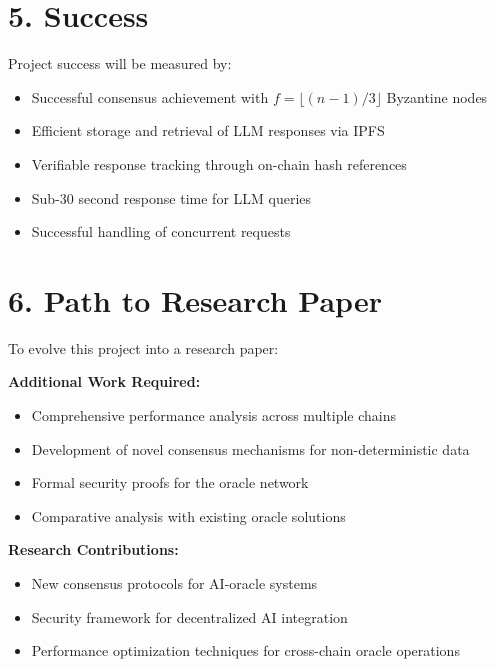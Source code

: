 \documentclass[12pt]{article}
\begin{document}
\section*{5. Success}
Project success will be measured by:
\begin{itemize}
    \item Successful consensus achievement with $f=\lfloor(n-1)/3\rfloor$ Byzantine nodes
    \item Efficient storage and retrieval of LLM responses via IPFS
    \item Verifiable response tracking through on-chain hash references
    \item Sub-30 second response time for LLM queries
    \item Successful handling of concurrent requests
\end{itemize}

\section*{6. Path to Research Paper}
To evolve this project into a research paper:

\textbf{Additional Work Required:}
\begin{itemize}
    \item Comprehensive performance analysis across multiple chains
    \item Development of novel consensus mechanisms for non-deterministic data
    \item Formal security proofs for the oracle network
    \item Comparative analysis with existing oracle solutions
\end{itemize}

\textbf{Research Contributions:}
\begin{itemize}
    \item New consensus protocols for AI-oracle systems
    \item Security framework for decentralized AI integration
    \item Performance optimization techniques for cross-chain oracle operations
\end{itemize}
\end{document}
